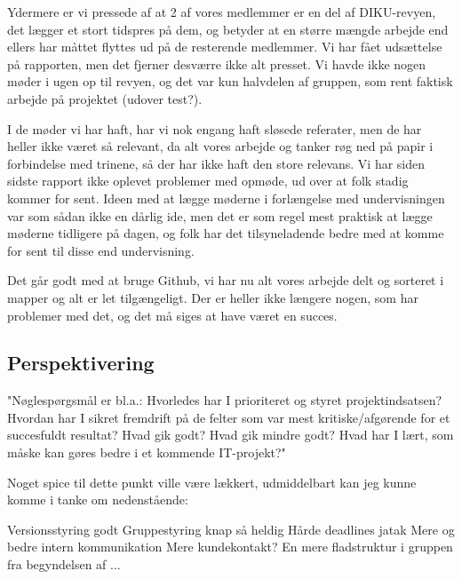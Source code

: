 \documentclass[10pt,a4paper,danish]{article}
\begin{document}
Ydermere er vi pressede af at 2 af vores medlemmer er en del af DIKU-revyen,
det lægger et stort tidspres på dem, og betyder at en større mængde arbejde
end ellers har måttet flyttes ud på de resterende medlemmer. Vi har fået
udsættelse på rapporten, men det fjerner desværre ikke alt presset. Vi havde
ikke nogen møder i ugen op til revyen, og det var kun halvdelen af gruppen,
som rent faktisk arbejde på projektet (udover test?).

I de møder vi har haft, har vi nok engang haft sløsede referater, men de har
heller ikke været så relevant, da alt vores arbejde og tanker røg ned på papir
i forbindelse med trinene, så der har ikke haft den store relevans. Vi har
siden sidste rapport ikke oplevet problemer med opmøde, ud over at folk stadig
kommer for sent. Ideen med at lægge møderne i forlængelse med undervisningen
var som sådan ikke en dårlig ide, men det er som regel mest praktisk at lægge
møderne tidligere på dagen, og folk har det tilsyneladende bedre med at komme
for sent til disse end undervisning. 

Det går godt med at bruge Github, vi har nu alt vores arbejde delt og sorteret
i mapper og alt er let tilgængeligt. Der er heller ikke længere nogen, som
har problemer med det, og det må siges at have været en succes.

\subsection{Perspektivering}

"Nøglespørgsmål er bl.a.: Hvorledes har I prioriteret og styret projektindsatsen?
Hvordan har I sikret fremdrift på de felter som var mest kritiske/afgørende for et
succesfuldt resultat? Hvad gik godt? Hvad gik mindre godt? Hvad har I lært, som
måske kan gøres bedre i et kommende IT-projekt?"

Noget spice til dette punkt ville være lækkert, udmiddelbart kan jeg kunne komme i tanke om nedenstående:

Versionsstyring godt
Gruppestyring knap så heldig
Hårde deadlines jatak
Mere og bedre intern kommunikation
Mere kundekontakt?
En mere fladstruktur i gruppen fra begyndelsen af
...
\end{document}
